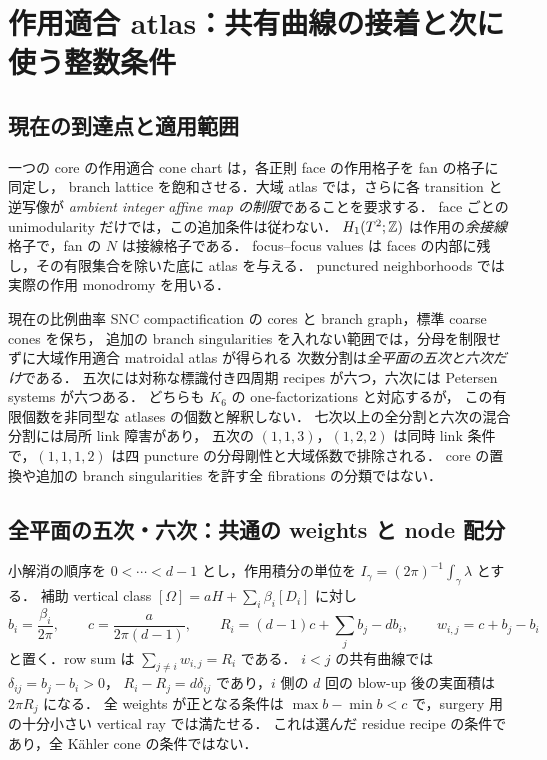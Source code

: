 \section{作用適合 atlas：共有曲線の接着と次に使う整数条件}

\subsection{現在の到達点と適用範囲}

一つの core の作用適合 cone chart は，各正則 face の作用格子を fan の格子に同定し，
branch lattice を飽和させる．大域 atlas では，さらに各 transition と逆写像が
\emph{ambient integer affine map の制限}であることを要求する．
face ごとの unimodularity だけでは，この追加条件は従わない．
$H_1(T^2;\mathbb Z)$ は作用の\emph{余接線}格子で，fan の $N$ は接線格子である．
focus--focus values は faces の内部に残し，その有限集合を除いた底に atlas を与える．
punctured neighborhoods では実際の作用 monodromy を用いる\cite{VuNgoc}．

現在の比例曲率 SNC compactification の cores と branch graph，標準 coarse cones を保ち，
追加の branch singularities を入れない範囲では，分母を制限せずに大域作用適合 matroidal atlas が得られる
次数分割は\emph{全平面の五次と六次だけ}である．
五次には対称な標識付き四周期 recipes が六つ，六次には Petersen systems が六つある．
どちらも $K_6$ の one-factorizations と対応するが，
この有限個数を非同型な atlases の個数と解釈しない．
七次以上の全分割と六次の混合分割には局所 link 障害があり，
五次の $(1,1,3)$，$(1,2,2)$ は同時 link 条件で，$(1,1,1,2)$ は四 puncture の分母剛性と大域係数で排除される．
core の置換や追加の branch singularities を許す全 fibrations の分類ではない．

\subsection{全平面の五次・六次：共通の weights と node 配分}

小解消の順序を $0<\cdots<d-1$ とし，作用積分の単位を
$I_\gamma=(2\pi)^{-1}\int_\gamma\lambda$ とする．
補助 vertical class $[\Omega]=aH+\sum_i\beta_i[D_i]$ に対し
\begin{equation*}
 b_i=\frac{\beta_i}{2\pi},\qquad
 c=\frac{a}{2\pi(d-1)},\qquad
 R_i=(d-1)c+\sum_jb_j-db_i,\qquad
 w_{i,j}=c+b_j-b_i
\end{equation*}
と置く．row sum は $\sum_{j\ne i}w_{i,j}=R_i$ である．
$i<j$ の共有曲線では $\delta_{ij}=b_j-b_i>0$，
$R_i-R_j=d\delta_{ij}$ であり，$i$ 側の $d$ 回の blow-up 後の実面積は $2\pi R_j$ になる．
全 weights が正となる条件は $\max b-\min b<c$ で，surgery 用の十分小さい vertical ray では満たせる．
これは選んだ residue recipe の条件であり，全 Kähler cone の条件ではない．

